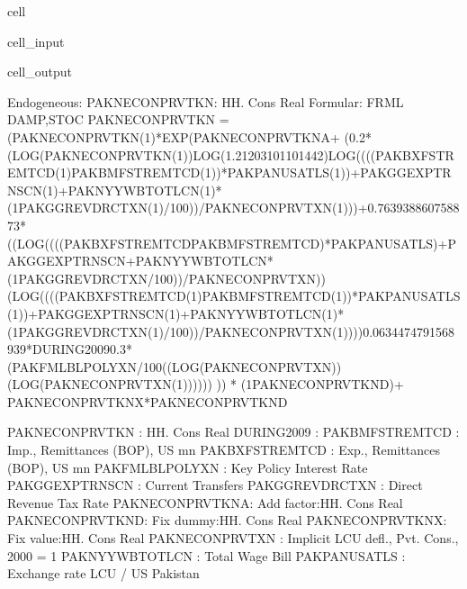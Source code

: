 \documentclass[letterpaper,10pt,english]{jupyterBook}
\begin{document}
\begin{sphinxuseclass}{cell}\begin{sphinxVerbatimInput}

\begin{sphinxuseclass}{cell_input}
\begin{sphinxVerbatim}[commandchars=\\\{\}]
 
\end{sphinxVerbatim}

\end{sphinxuseclass}\end{sphinxVerbatimInput}
\begin{sphinxVerbatimOutput}

\begin{sphinxuseclass}{cell_output}
\begin{sphinxVerbatim}[commandchars=\\\{\}]
Endogeneous: PAKNECONPRVTKN: HH. Cons Real
Formular: FRML \PYGZlt{}DAMP,STOC\PYGZgt{} PAKNECONPRVTKN = (PAKNECONPRVTKN(\PYGZhy{}1)*EXP(PAKNECONPRVTKN\PYGZus{}A+ (\PYGZhy{}0.2*(LOG(PAKNECONPRVTKN(\PYGZhy{}1))\PYGZhy{}LOG(1.21203101101442)\PYGZhy{}LOG((((PAKBXFSTREMTCD(\PYGZhy{}1)\PYGZhy{}PAKBMFSTREMTCD(\PYGZhy{}1))*PAKPANUSATLS(\PYGZhy{}1))+PAKGGEXPTRNSCN(\PYGZhy{}1)+PAKNYYWBTOTLCN(\PYGZhy{}1)*(1\PYGZhy{}PAKGGREVDRCTXN(\PYGZhy{}1)/100))/PAKNECONPRVTXN(\PYGZhy{}1)))+0.763938860758873*((LOG((((PAKBXFSTREMTCD\PYGZhy{}PAKBMFSTREMTCD)*PAKPANUSATLS)+PAKGGEXPTRNSCN+PAKNYYWBTOTLCN*(1\PYGZhy{}PAKGGREVDRCTXN/100))/PAKNECONPRVTXN))\PYGZhy{}(LOG((((PAKBXFSTREMTCD(\PYGZhy{}1)\PYGZhy{}PAKBMFSTREMTCD(\PYGZhy{}1))*PAKPANUSATLS(\PYGZhy{}1))+PAKGGEXPTRNSCN(\PYGZhy{}1)+PAKNYYWBTOTLCN(\PYGZhy{}1)*(1\PYGZhy{}PAKGGREVDRCTXN(\PYGZhy{}1)/100))/PAKNECONPRVTXN(\PYGZhy{}1))))\PYGZhy{}0.0634474791568939*DURING\PYGZus{}2009\PYGZhy{}0.3*(PAKFMLBLPOLYXN/100\PYGZhy{}((LOG(PAKNECONPRVTXN))\PYGZhy{}(LOG(PAKNECONPRVTXN(\PYGZhy{}1)))))) )) * (1\PYGZhy{}PAKNECONPRVTKN\PYGZus{}D)+ PAKNECONPRVTKN\PYGZus{}X*PAKNECONPRVTKN\PYGZus{}D  \PYGZdl{}

PAKNECONPRVTKN  : HH. Cons Real
DURING\PYGZus{}2009     : 
PAKBMFSTREMTCD  : Imp., Remittances (BOP), US\PYGZdl{} mn
PAKBXFSTREMTCD  : Exp., Remittances (BOP), US\PYGZdl{} mn
PAKFMLBLPOLYXN  : Key Policy Interest Rate
PAKGGEXPTRNSCN  : Current Transfers
PAKGGREVDRCTXN  : Direct Revenue Tax Rate
PAKNECONPRVTKN\PYGZus{}A: Add factor:HH. Cons Real
PAKNECONPRVTKN\PYGZus{}D: Fix dummy:HH. Cons Real
PAKNECONPRVTKN\PYGZus{}X: Fix value:HH. Cons Real
PAKNECONPRVTXN  : Implicit LCU defl., Pvt. Cons., 2000 = 1
PAKNYYWBTOTLCN  : Total Wage Bill
PAKPANUSATLS    : Exchange rate LCU / US\PYGZdl{} \PYGZhy{} Pakistan


\end{sphinxVerbatim}
\end{sphinxuseclass}
\end{sphinxVerbatimOutput}
\end{sphinxuseclass}
\end{document}
